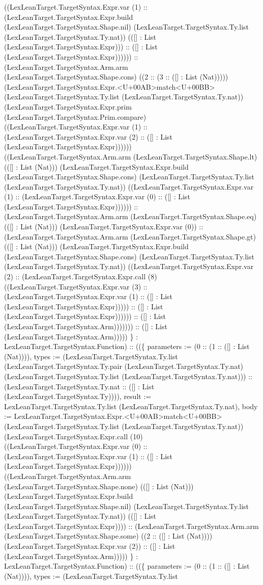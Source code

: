 \documentclass[11pt]{article}
\begin{document}
((LexLeanTarget.TargetSyntax.Expr.var (1) :: (LexLeanTarget.TargetSyntax.Expr.build (LexLeanTarget.TargetSyntax.Shape.nil) (LexLeanTarget.TargetSyntax.Ty.list (LexLeanTarget.TargetSyntax.Ty.nat)) (([] : List (LexLeanTarget.TargetSyntax.Expr))) :: ([] : List (LexLeanTarget.TargetSyntax.Expr)))))) :: (LexLeanTarget.TargetSyntax.Arm.arm (LexLeanTarget.TargetSyntax.Shape.cons) ((2 :: (3 :: ([] : List (Nat))))) (LexLeanTarget.TargetSyntax.Expr.<U+00AB>match<U+00BB> (LexLeanTarget.TargetSyntax.Ty.list (LexLeanTarget.TargetSyntax.Ty.nat)) (LexLeanTarget.TargetSyntax.Expr.prim (LexLeanTarget.TargetSyntax.Prim.compare) ((LexLeanTarget.TargetSyntax.Expr.var (1) :: (LexLeanTarget.TargetSyntax.Expr.var (2) :: ([] : List (LexLeanTarget.TargetSyntax.Expr)))))) ((LexLeanTarget.TargetSyntax.Arm.arm (LexLeanTarget.TargetSyntax.Shape.lt) (([] : List (Nat))) (LexLeanTarget.TargetSyntax.Expr.build (LexLeanTarget.TargetSyntax.Shape.cons) (LexLeanTarget.TargetSyntax.Ty.list (LexLeanTarget.TargetSyntax.Ty.nat)) ((LexLeanTarget.TargetSyntax.Expr.var (1) :: (LexLeanTarget.TargetSyntax.Expr.var (0) :: ([] : List (LexLeanTarget.TargetSyntax.Expr)))))) :: (LexLeanTarget.TargetSyntax.Arm.arm (LexLeanTarget.TargetSyntax.Shape.eq) (([] : List (Nat))) (LexLeanTarget.TargetSyntax.Expr.var (0)) :: (LexLeanTarget.TargetSyntax.Arm.arm (LexLeanTarget.TargetSyntax.Shape.gt) (([] : List (Nat))) (LexLeanTarget.TargetSyntax.Expr.build (LexLeanTarget.TargetSyntax.Shape.cons) (LexLeanTarget.TargetSyntax.Ty.list (LexLeanTarget.TargetSyntax.Ty.nat)) ((LexLeanTarget.TargetSyntax.Expr.var (2) :: (LexLeanTarget.TargetSyntax.Expr.call (8) ((LexLeanTarget.TargetSyntax.Expr.var (3) :: (LexLeanTarget.TargetSyntax.Expr.var (1) :: ([] : List (LexLeanTarget.TargetSyntax.Expr))))) :: ([] : List (LexLeanTarget.TargetSyntax.Expr)))))) :: ([] : List (LexLeanTarget.TargetSyntax.Arm))))))) :: ([] : List (LexLeanTarget.TargetSyntax.Arm))))) \} : LexLeanTarget.TargetSyntax.Function) :: ((\{ parameters := (0 :: (1 :: ([] : List (Nat)))), types := (LexLeanTarget.TargetSyntax.Ty.list (LexLeanTarget.TargetSyntax.Ty.pair (LexLeanTarget.TargetSyntax.Ty.nat) (LexLeanTarget.TargetSyntax.Ty.list (LexLeanTarget.TargetSyntax.Ty.nat))) :: (LexLeanTarget.TargetSyntax.Ty.nat :: ([] : List (LexLeanTarget.TargetSyntax.Ty)))), result := LexLeanTarget.TargetSyntax.Ty.list (LexLeanTarget.TargetSyntax.Ty.nat), body := LexLeanTarget.TargetSyntax.Expr.<U+00AB>match<U+00BB> (LexLeanTarget.TargetSyntax.Ty.list (LexLeanTarget.TargetSyntax.Ty.nat)) (LexLeanTarget.TargetSyntax.Expr.call (10) ((LexLeanTarget.TargetSyntax.Expr.var (0) :: (LexLeanTarget.TargetSyntax.Expr.var (1) :: ([] : List (LexLeanTarget.TargetSyntax.Expr)))))) ((LexLeanTarget.TargetSyntax.Arm.arm (LexLeanTarget.TargetSyntax.Shape.none) (([] : List (Nat))) (LexLeanTarget.TargetSyntax.Expr.build (LexLeanTarget.TargetSyntax.Shape.nil) (LexLeanTarget.TargetSyntax.Ty.list (LexLeanTarget.TargetSyntax.Ty.nat)) (([] : List (LexLeanTarget.TargetSyntax.Expr)))) :: (LexLeanTarget.TargetSyntax.Arm.arm (LexLeanTarget.TargetSyntax.Shape.some) ((2 :: ([] : List (Nat)))) (LexLeanTarget.TargetSyntax.Expr.var (2)) :: ([] : List (LexLeanTarget.TargetSyntax.Arm))))) \} : LexLeanTarget.TargetSyntax.Function) :: ((\{ parameters := (0 :: (1 :: ([] : List (Nat)))), types := (LexLeanTarget.TargetSyntax.Ty.list 
\end{document}
